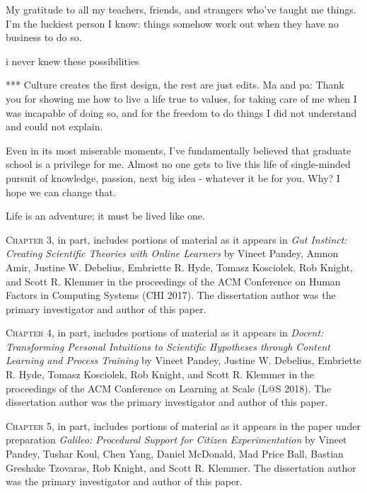 \begin{frontmatter}
\begin{acknowledgements}
My gratitude to all my teachers, friends, and strangers who’ve taught me things. I’m the luckiest person I know: things somehow work out when they have no business to do so.


i never knew these possibilities 

***
Culture creates the first design, the rest are just edits. Ma and pa: Thank you for showing me how to live a life true to values, for taking care of me when I was incapable of doing so, and for the freedom to do things I did not understand and could not explain. 


Even in its most miserable moments, I’ve fundamentally believed that graduate school is a privilege for me. Almost no one gets to live this life of single-minded pursuit of knowledge, passion, next big idea - whatever it be for you. Why? I hope we can change that. 

Life is an adventure; it must be lived like one. 

 




\vspace{0.25in}

\textsc{Chapter 3}, in part, includes portions of material as it appears in \emph{Gut Instinct: Creating Scientific Theories with Online Learners} by Vineet Pandey, Amnon Amir, Justine W. Debelius, Embriette R. Hyde, Tomasz Kosciolek, Rob Knight, and Scott R. Klemmer in the proceedings of the ACM Conference on Human Factors in Computing Systems (CHI 2017). The dissertation author was the primary investigator and author of this paper.

\textsc{Chapter 4}, in part, includes portions of material as it appears in \emph{Docent: Transforming Personal Intuitions to Scientific Hypotheses through Content Learning and Process Training} by Vineet Pandey, Justine W. Debelius, Embriette R. Hyde, Tomasz Kosciolek, Rob Knight, and Scott R. Klemmer in the proceedings of the ACM Conference on Learning at Scale (L@S 2018). The dissertation author was the primary investigator and author of this paper.

\textsc{Chapter 5}, in part, includes portions of material as it appears in the paper under preparation \emph{Galileo: Procedural Support for Citizen Experimentation} by Vineet Pandey, Tushar Koul, Chen Yang, Daniel McDonald, Mad Price Ball, Bastian Greshake Tzovaras, Rob Knight, and Scott R. Klemmer. The dissertation author was the primary investigator and author of this paper.

\end{acknowledgements}


\end{frontmatter}
